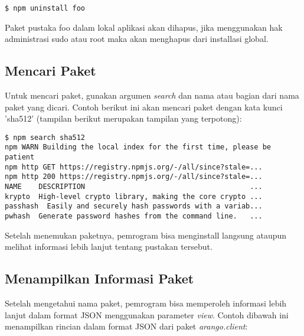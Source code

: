 \lstset{language=bash,caption=Perintah menghapus paket di npm}
\begin{lstlisting}
$ npm uninstall foo
\end{lstlisting}

Paket pustaka foo dalam lokal aplikasi akan dihapus, jika menggunakan hak administrasi sudo atau root maka akan menghapus dari installasi global.

\subsection{Mencari Paket}

Untuk mencari paket, gunakan argumen \textit{search} dan nama atau bagian dari nama paket yang dicari. Contoh berikut ini akan mencari paket dengan kata kunci 'sha512' (tampilan berikut merupakan tampilan yang terpotong):

\lstset{language=bash,caption=Perintah menghapus paket di npm}
\begin{lstlisting}
$ npm search sha512
npm WARN Building the local index for the first time, please be patient
npm http GET https://registry.npmjs.org/-/all/since?stale=...
npm http 200 https://registry.npmjs.org/-/all/since?stale=...
NAME    DESCRIPTION                                       ...
krypto  High-level crypto library, making the core crypto ...
passhash  Easily and securely hash passwords with a variab...
pwhash  Generate password hashes from the command line.   ...
\end{lstlisting}

Setelah menemukan paketnya, pemrogram bisa menginstall langsung ataupun melihat informasi lebih lanjut tentang pustakan tersebut.

\subsection{Menampilkan Informasi Paket}

Setelah mengetahui nama paket, pemrogram bisa memperoleh informasi lebih lanjut dalam format JSON menggunakan parameter \textit{view}. Contoh dibawah ini menampilkan rincian dalam format JSON dari paket \textit{arango.client}:

